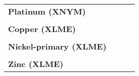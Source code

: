 \documentclass[
  authoryear,
  preprint,
  3p]{elsarticle}
\begin{document}
\begin{longtable}[t]{>{}l>{}l>{}l>{}l}
\textbf{Platinum (XNYM)} & \textcolor[HTML]{4285f4}{} & \textcolor[HTML]{4285f4}{} & \textcolor[HTML]{4285f4}{}\\
\textbf{\cellcolor{gray!10}{Aluminium (XLME)}} & \textcolor[HTML]{4285f4}{\cellcolor{gray!10}{GB}} & \textcolor[HTML]{4285f4}{\cellcolor{gray!10}{metals}} & \textcolor[HTML]{4285f4}{\cellcolor{gray!10}{base}}\\
\addlinespace
\textbf{Copper (XLME)} & \textcolor[HTML]{4285f4}{} & \textcolor[HTML]{4285f4}{} & \textcolor[HTML]{4285f4}{}\\
\textbf{\cellcolor{gray!10}{Lead (XLME)}} & \textcolor[HTML]{4285f4}{\cellcolor{gray!10}{}} & \textcolor[HTML]{4285f4}{\cellcolor{gray!10}{}} & \textcolor[HTML]{4285f4}{\cellcolor{gray!10}{}}\\
\textbf{Nickel-primary (XLME)} & \textcolor[HTML]{4285f4}{} & \textcolor[HTML]{4285f4}{} & \textcolor[HTML]{4285f4}{}\\
\textbf{\cellcolor{gray!10}{Tin-refined (XLME)}} & \textcolor[HTML]{4285f4}{\cellcolor{gray!10}{}} & \textcolor[HTML]{4285f4}{\cellcolor{gray!10}{}} & \textcolor[HTML]{4285f4}{\cellcolor{gray!10}{}}\\
\textbf{Zinc (XLME)} & \textcolor[HTML]{4285f4}{} & \textcolor[HTML]{4285f4}{} & \textcolor[HTML]{4285f4}{}\\
\bottomrule

\end{longtable}

\endgroup{}

\newpage


\renewcommand\refname{References}
  
\end{document}
